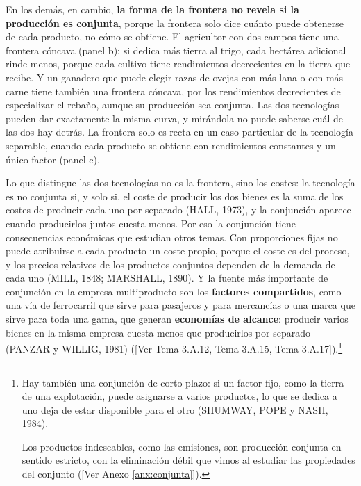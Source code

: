 \documentclass[10pt,a4paper]{article}
\newcommand{\authorfont}[1]{{\fontfamily{EBGaramond-TLF}\selectfont #1}}
\begin{document}
En los demás, en cambio, \textbf{la forma de la frontera no revela si la producción es conjunta}, porque la frontera solo dice cuánto puede obtenerse de cada producto, no cómo se obtiene. El agricultor con dos campos tiene una frontera cóncava (panel b): si dedica más tierra al trigo, cada hectárea adicional rinde menos, porque cada cultivo tiene rendimientos decrecientes en la tierra que recibe. Y un ganadero que puede elegir razas de ovejas con más lana o con más carne tiene también una frontera cóncava, por los rendimientos decrecientes de especializar el rebaño, aunque su producción sea conjunta. Las dos tecnologías pueden dar exactamente la misma curva, y mirándola no puede saberse cuál de las dos hay detrás. La frontera solo es recta en un caso particular de la tecnología separable, cuando cada producto se obtiene con rendimientos constantes y un único factor (panel c).

Lo que distingue las dos tecnologías no es la frontera, sino los costes: la tecnología es no conjunta si, y solo si, el coste de producir los dos bienes es la suma de los costes de producir cada uno por separado (HALL, 1973), y la conjunción aparece cuando producirlos juntos cuesta menos. Por eso la conjunción tiene consecuencias económicas que estudian otros temas. Con proporciones fijas no puede atribuirse a cada producto un coste propio, porque el coste es del proceso, y los precios relativos de los productos conjuntos dependen de la demanda de cada uno (MILL, 1848; MARSHALL, 1890). Y la fuente más importante de conjunción en la empresa multiproducto son los \textbf{factores compartidos}, como una vía de ferrocarril que sirve para pasajeros y para mercancías o una marca que sirve para toda una gama, que generan \textbf{economías de alcance}: producir varios bienes en la misma empresa cuesta menos que producirlos por separado (PANZAR y WILLIG, 1981) ([\authorfont{Ver Tema 3.A.12, Tema 3.A.15, Tema 3.A.17}]).\footnote{%
    Hay también una conjunción de corto plazo: si un factor fijo, como la tierra de una explotación, puede asignarse a varios productos, lo que se dedica a uno deja de estar disponible para el otro (SHUMWAY, POPE y NASH, 1984). 
    
    Los productos indeseables, como las emisiones, son producción conjunta en sentido estricto, con la eliminación débil que vimos al estudiar las propiedades del conjunto ([\authorfont{Ver Anexo \ref{anx:conjunta}}]).
}


\clearpage
\end{document}
